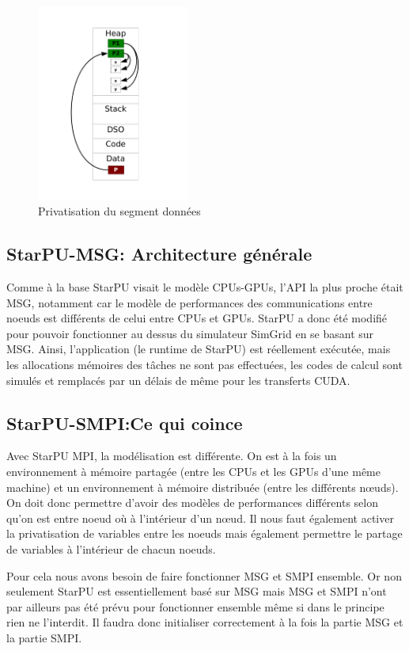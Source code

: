\documentclass[smallextended]{svjour3}
\begin{document}
\begin{figure}[htb]
\centering
\includegraphics[width=5cm]{./Img/Memoire.pdf}
\caption{\label{fig:1}Privatisation du segment données}
\end{figure}

\subsection{StarPU-MSG: Architecture générale}
\label{sec-3-2}
Comme à la base StarPU visait le modèle CPUs-GPUs, l'API la plus
proche était MSG, notamment car le modèle de performances des
communications entre noeuds est différents de celui entre CPUs et
GPUs. StarPU a donc été modifié pour pouvoir fonctionner au dessus
du simulateur SimGrid en se basant sur MSG. Ainsi, l'application
(le runtime de StarPU) est réellement exécutée, mais les
allocations mémoires des tâches ne sont pas effectuées, les codes
de calcul sont simulés et remplacés par un délais de même pour les
transferts CUDA.  

\subsection{StarPU-SMPI:Ce qui coince}
\label{sec-3-3}
Avec StarPU MPI, la modélisation est différente. On est à la fois
un environnement à mémoire partagée (entre les CPUs et les GPUs
d'une même machine) et un environnement à mémoire distribuée
(entre les différents nœuds). On doit donc permettre d'avoir des
modèles de performances différents selon qu'on est entre noeud où à
l'intérieur d'un nœud. Il nous faut également activer la
privatisation de variables entre les noeuds mais également
permettre le partage de variables à l'intérieur de chacun noeuds. 

Pour cela nous avons besoin de faire fonctionner MSG et SMPI
ensemble. Or non seulement StarPU est essentiellement basé sur MSG
mais MSG et SMPI n'ont par ailleurs pas été prévu pour fonctionner
ensemble même si dans le principe rien ne l'interdit. Il
faudra donc initialiser correctement à la fois la partie MSG et la
partie SMPI.  
\end{document}
